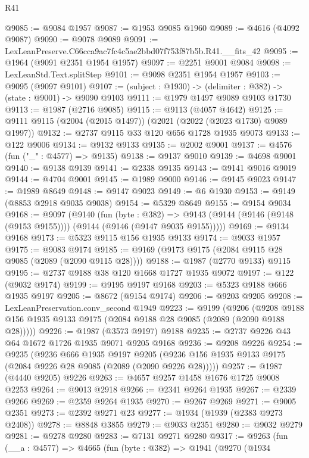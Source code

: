 \begin{lexlean}{R41}
\begin{coremodule}
@9085 := @9084 @1957
@9087 := @1953 @9085 @1960
@9089 := @4616 (@4092 @9087)
@9090 := @9078 @9089
@9091 := LexLeanPreserve.C66cca9ac7fc4c5ae2bbd07f753f87b5b.R41.__fits_42
@9095 := @1964 (@9091 @2351 @1954 @1957)
@9097 := @2251 @9001 @9084
@9098 := LexLeanStd.Text.splitStep
@9101 := @9098 @2351 @1954 @1957
@9103 := @9095 (@9097 @9101)
@9107 := (subject : @1930) -> (delimiter : @382) -> (state : @9001) -> @9090 @9103
@9111 := @1979 @1497 @9089 @9103 @1730
@9113 := @1987 (@2716 @9085)
@9115 := @9113 (@4057 @4642)
@9125 := @9111 @9115 (@2004 (@2015 @1497)) (@2021 (@2022 (@2023 @1730) @9089 @1997))
@9132 := @2737 @9115 @33 @120 @656 @1728 @1935 @9073
@9133 := @122 @9006
@9134 := @9132 @9133
@9135 := @2002 @9001
@9137 := @4576 (fun ("_" : @4577) => @9135)
@9138 := @9137 @9010
@9139 := @4698 @9001
@9140 := @9138 @9139
@9141 := @2338 @9135
@9143 := @9141 @9016 @9019
@9144 := @4704 @9001
@9145 := @1989 @9000
@9146 := @9145 @9023
@9147 := @1989 @8649
@9148 := @9147 @9023
@9149 := @6 @1930
@9153 := @9149 (@8853 @2918 @9035 @9038)
@9154 := @5329 @8649
@9155 := @9154 @9034
@9168 := @9097
    (@9140
      (fun (byte : @382) =>
      @9143 (@9144 (@9146 (@9148 (@9153 @9155)))) (@9144 (@9146 (@9147 @9035 @9155)))))
@9169 := @9134 @9168
@9173 := @5323 @9115 @156 @1935 @9133
@9174 := @9033 @1957
@9175 := @9083 @9174
@9185 := @9169 (@9173 @9175 (@2084 @9115 @28 @9085 (@2089 (@2090 @9115 @28))))
@9188 := @1987 (@2770 @9133) @9115
@9195 := @2737 @9188 @38 @120 @1668 @1727 @1935 @9072
@9197 := @122 (@9032 @9174)
@9199 := @9195 @9197 @9168
@9203 := @5323 @9188 @666 @1935 @9197
@9205 := @8672 (@9154 @9174)
@9206 := @9203 @9205
@9208 := LexLeanPreservation.conv_second @1949
@9223 := @9199
    (@9206 (@9208 @9188 @156 @1935 @9133 @9175 (@2084 @9188 @28 @9085 (@2089 (@2090 @9188 @28)))))
@9226 := @1987 (@3573 @9197) @9188
@9235 := @2737 @9226 @43 @64 @1672 @1726 @1935 @9071 @9205 @9168
@9236 := @9208 @9226
@9254 := @9235
    (@9236
      @666
      @1935
      @9197
      @9205
      (@9236 @156 @1935 @9133 @9175 (@2084 @9226 @28 @9085 (@2089 (@2090 @9226 @28)))))
@9257 := @1987 (@4440 @9205) @9226
@9263 := @4657 @9257 @1458 @1676 @1725 @9008 @2253
@9264 := @9013 @2918
@9266 := @2341 @9264 @1935
@9267 := @2339 @9266
@9269 := @2359 @9264 @1935
@9270 := @9267 @9269
@9271 := @9005 @2351
@9273 := @2392 @9271 @23
@9277 := @1934 (@1939 (@2383 @9273 @2408))
@9278 := @8848 @3855
@9279 := @9033 @2351
@9280 := @9032 @9279
@9281 := @9278 @9280
@9283 := @7131 @9271 @9280
@9317 := @9263
    (fun (__a : @4577) =>
    @4665
      (fun (byte : @382) =>
      @1941
        (@9270
          (@1934

\end{coremodule}
\end{lexlean}
